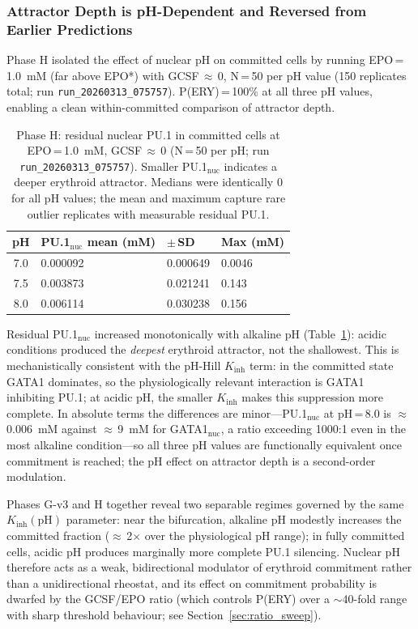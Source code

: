 \subsubsection*{Attractor Depth is pH-Dependent and Reversed from Earlier Predictions}

Phase H isolated the effect of nuclear pH on committed cells by running EPO\,=\,1.0~mM (far above EPO*) with GCSF\,$\approx$\,0, N\,=\,50 per pH value (150 replicates total; run \texttt{run\_20260313\_075757}). P(ERY)\,=\,100\% at all three pH values, enabling a clean within-committed comparison of attractor depth.

\begin{table}[ht]
\caption{Phase H: residual nuclear PU.1 in committed cells at EPO\,=\,1.0~mM, GCSF\,$\approx$\,0 (N\,=\,50 per pH; run \texttt{run\_20260313\_075757}). Smaller PU.1$_\text{nuc}$ indicates a deeper erythroid attractor. Medians were identically 0 for all pH values; the mean and maximum capture rare outlier replicates with measurable residual PU.1.}
\label{tab:phaseh}
\centering
\small
\begin{tabularx}{\linewidth}{@{}cXXX@{}}
\toprule
\textbf{pH} & \textbf{PU.1$_\text{nuc}$ mean (mM)} & \textbf{$\pm$\,SD} & \textbf{Max (mM)} \\
\midrule
7.0 & 0.000092 & 0.000649 & 0.0046 \\
7.5 & 0.003873 & 0.021241 & 0.143  \\
8.0 & 0.006114 & 0.030238 & 0.156  \\
\bottomrule
\end{tabularx}
\end{table}

Residual PU.1$_\text{nuc}$ increased monotonically with alkaline pH (Table~\ref{tab:phaseh}): acidic conditions produced the \emph{deepest} erythroid attractor, not the shallowest. This is mechanistically consistent with the pH-Hill $K_{\mathrm{inh}}$ term: in the committed state GATA1 dominates, so the physiologically relevant interaction is GATA1 inhibiting PU.1; at acidic pH, the smaller $K_{\mathrm{inh}}$ makes this suppression more complete. In absolute terms the differences are minor---PU.1$_\text{nuc}$ at pH\,=\,8.0 is $\approx$\,0.006~mM against $\approx$\,9~mM for GATA1$_\text{nuc}$, a ratio exceeding 1000:1 even in the most alkaline condition---so all three pH values are functionally equivalent once commitment is reached; the pH effect on attractor depth is a second-order modulation.

Phases G-v3 and H together reveal two separable regimes governed by the same $K_{\mathrm{inh}}(\mathrm{pH})$ parameter: near the bifurcation, alkaline pH modestly increases the committed fraction ($\approx$\,2$\times$ over the physiological pH range); in fully committed cells, acidic pH produces marginally more complete PU.1 silencing. Nuclear pH therefore acts as a weak, bidirectional modulator of erythroid commitment rather than a unidirectional rheostat, and its effect on commitment probability is dwarfed by the GCSF/EPO ratio (which controls P(ERY) over a $\sim$40-fold range with sharp threshold behaviour; see Section~\ref{sec:ratio_sweep}).
